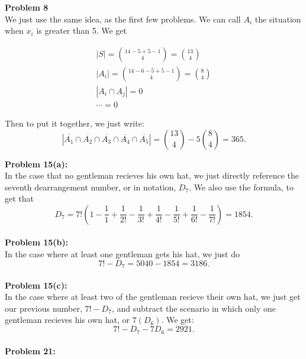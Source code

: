 \documentclass[12pt]{article}
\begin{document}
\noindent
\textbf{Problem 8}\\

\noindent
We just use the same idea, as the first few problems. We can call $A_i$ the situation when $x_i$ is greater
than 5. We get

\begin{align}
	|S| = \binom{14-5+5-1}{4} = \binom{13}{4} \\
	|A_i| = \binom{14-6-5+5-1}{4} = \binom{8}{4}\\
	|A_i \cap A_j| = 0 \\
	\cdots = 0
\end{align}

Then to put it together, we just write:
\[
	|\overline{A_1} \cap \overline{A_2} \cap\overline{A_3} \cap\overline{A_4} \cap \overline{A_5}| = 
	\binom{13}{4} - 5\binom{8}{4} = 365
.\] 

\noindent
\textbf{Problem 15(a):}\\

\noindent
In the case that no gentleman recieves his own hat, we just directly reference the seventh dearrangement
number, or in notation, $D_7$. We also use the formula, to get that
\[
D_7 = 
7!(1 - \frac{1}{1} + \frac{1}{2!} - \frac{1}{3!} + \frac{1}{4!} - 
\frac{1}{5!} + \frac{1}{6!} - \frac{1}{7!}) = 1854
.\] \\

\noindent
\textbf{Problem 15(b):}\\

\noindent
In the case where at least one gentleman gets his hat, we just do
\[
7! - D_7 = 5040-1854 = 3186
.\] \\

\noindent
\textbf{Problem 15(c):}\\

\noindent
In the case where at least two of the gentleman recieve their own hat, we just get
our previous number, $7!-D_7$, and subtract the scenario in which only one gentleman
recieves his own hat, or $7(D_6)$. We get:
\[
7!-D_7-7D_6 = 2921
.\]\\
 
\noindent
\textbf{Problem 21:}\\
\end{document}
